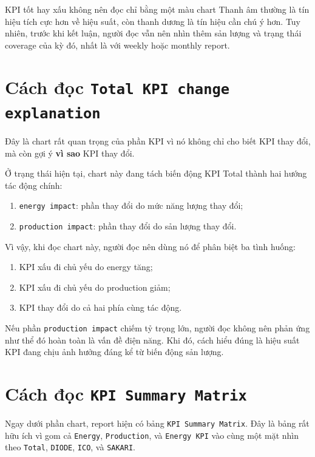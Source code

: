 \begin{ReaderNote}{KPI tốt hay xấu không nên đọc chỉ bằng một màu chart}
Thanh âm thường là tín hiệu tích cực hơn về hiệu suất, còn thanh dương là tín hiệu cần chú ý hơn. Tuy nhiên, trước khi kết luận, người đọc vẫn nên nhìn thêm sản lượng và trạng thái coverage của kỳ đó, nhất là với weekly hoặc monthly report.
\end{ReaderNote}

\section{Cách đọc \texttt{Total KPI change explanation}}

Đây là chart rất quan trọng của phần KPI vì nó không chỉ cho biết KPI thay đổi, mà còn gợi ý \textbf{vì sao} KPI thay đổi.

Ở trạng thái hiện tại, chart này đang tách biến động KPI Total thành hai hướng tác động chính:

\begin{enumerate}[label=-]
\item \texttt{energy impact}: phần thay đổi do mức năng lượng thay đổi;
\item \texttt{production impact}: phần thay đổi do sản lượng thay đổi.
\end{enumerate}

Vì vậy, khi đọc chart này, người đọc nên dùng nó để phân biệt ba tình huống:

\begin{enumerate}[label=-]
\item KPI xấu đi chủ yếu do energy tăng;
\item KPI xấu đi chủ yếu do production giảm;
\item KPI thay đổi do cả hai phía cùng tác động.
\end{enumerate}

Nếu phần \texttt{production impact} chiếm tỷ trọng lớn, người đọc không nên phản ứng như thể đó hoàn toàn là vấn đề điện năng. Khi đó, cách hiểu đúng là hiệu suất KPI đang chịu ảnh hưởng đáng kể từ biến động sản lượng.

\section{Cách đọc \texttt{KPI Summary Matrix}}

Ngay dưới phần chart, report hiện có bảng \texttt{KPI Summary Matrix}. Đây là bảng rất hữu ích vì gom cả \texttt{Energy}, \texttt{Production}, và \texttt{Energy KPI} vào cùng một mặt nhìn theo \texttt{Total}, \texttt{DIODE}, \texttt{ICO}, và \texttt{SAKARI}.

